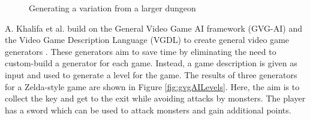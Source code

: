 \begin{figure}[H]
    \centering
    \hfill
    \caption{Generating a variation from a larger dungeon \cite{Graph_Constraint_Dungeon}}
    \label{fig:graphDungeon}
\end{figure}

A. Khalifa et al. build on the General Video Game AI framework (GVG-AI) and the Video Game Description Language (VGDL) to create general video game generators \cite{GVG-AI_and_VGDL_Level_Generators}. These generators aim to save time by eliminating the need to custom-build a generator for each game. Instead, a game description is given as input and used to generate a level for the game. The results of three generators for a Zelda-style game are shown in Figure \ref{fig:gvgAILevels}. Here, the aim is to collect the key and get to the exit while avoiding attacks by monsters. The player has a sword which can be used to attack monsters and gain additional points.

